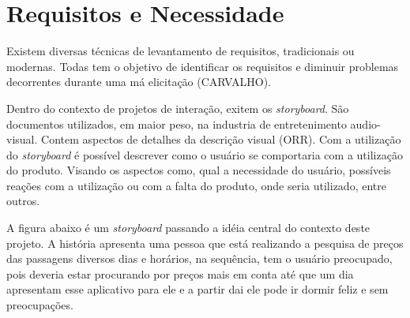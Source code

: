 \chapter[Requisitos e Necessidade]{Requisitos e Necessidade}

Existem diversas técnicas de levantamento de requisitos, tradicionais ou modernas. Todas tem o objetivo de identificar os requisitos e diminuir problemas decorrentes durante uma má elicitação (CARVALHO).

Dentro do contexto de projetos de interação, exitem os \textit{storyboard}. São documentos utilizados, em maior peso, na industria de entretenimento audio-visual. Contem aspectos de detalhes da descrição visual (ORR). Com a utilização do \textit{storyboard} é possível descrever como o usuário se comportaria com a utilização do produto. Visando os aspectos como, qual a necessidade do usuário, possíveis reações com a utilização ou com a falta do produto, onde seria utilizado, entre outros.

A figura abaixo é um \textit{storyboard} passando a idéia central do contexto deste projeto. A história apresenta uma pessoa que está realizando a pesquisa de preços das passagens diversos  dias e horários, na sequência, tem o usuário preocupado, pois deveria estar procurando por preços mais em conta até que um dia apresentam esse aplicativo para ele e a partir dai ele pode ir dormir feliz e sem preocupações.

